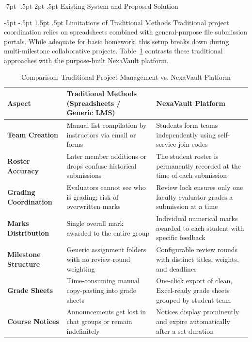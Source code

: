 \documentclass[11pt,a4paper]{article}
\makeatletter
\renewcommand\section{\@startsection {section}{1}{\z@}%
  {-7pt \@plus -1.5pt \@minus -.5pt}%
  {2pt \@plus .5pt}%
  {\normalfont\large\bfseries\color{nexaNavy}}}
\renewcommand\subsection{\@startsection{subsection}{2}{\z@}%
  {-5pt \@plus -1pt \@minus -.5pt}%
  {1.5pt \@plus .5pt}%
  {\normalfont\normalsize\bfseries\color{nexaSlate}}}
\makeatother
\begin{document}
\section{Existing System and Proposed Solution}

\subsection{Limitations of Traditional Methods}
Traditional project coordination relies on spreadsheets combined with general-purpose file submission portals. While adequate for basic homework, this setup breaks down during multi-milestone collaborative projects. Table~\ref{tab:comparison} contrasts these traditional approaches with the purpose-built NexaVault platform.

\begin{table}[htbp]
\centering
\small
\caption{Comparison: Traditional Project Management vs. NexaVault Platform}
\label{tab:comparison}
\vspace{0.15cm}
\begin{tabularx}{\textwidth}{|l|X|X|}
\hline\hline
\textbf{Aspect} & \textbf{Traditional Methods (Spreadsheets / Generic LMS)} & \textbf{NexaVault Platform} \\
\hline\hline
\textbf{Team Creation} & Manual list compilation by instructors via email or forms & Students form teams independently using self-service join codes \\
\hline
\textbf{Roster Accuracy} & Later member additions or drops confuse historical submissions & The student roster is permanently recorded at the time of each submission \\
\hline
\textbf{Grading Coordination} & Evaluators cannot see who is grading; risk of overwritten marks & Review lock ensures only one faculty evaluator grades a submission at a time \\
\hline
\textbf{Marks Distribution} & Single overall mark awarded to the entire group & Individual numerical marks awarded to each student with specific feedback \\
\hline
\textbf{Milestone Structure} & Generic assignment folders with no review-round weighting & Configurable review rounds with distinct titles, weights, and deadlines \\
\hline
\textbf{Grade Sheets} & Time-consuming manual copy-pasting into grade sheets & One-click export of clean, Excel-ready grade sheets grouped by student team \\
\hline
\textbf{Course Notices} & Announcements get lost in chat groups or remain indefinitely & Notices display prominently and expire automatically after a set duration \\
\hline\hline
\end{tabularx}
\end{table}
\end{document}
